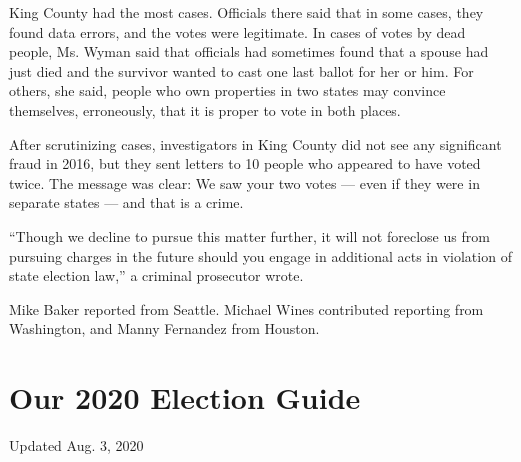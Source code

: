 King County had the most cases. Officials there said that in some cases,
they found data errors, and the votes were legitimate. In cases of votes
by dead people, Ms. Wyman said that officials had sometimes found that a
spouse had just died and the survivor wanted to cast one last ballot for
her or him. For others, she said, people who own properties in two
states may convince themselves, erroneously, that it is proper to vote
in both places.

After scrutinizing cases, investigators in King County did not see any
significant fraud in 2016, but they sent letters to 10 people who
appeared to have voted twice. The message was clear: We saw your two
votes --- even if they were in separate states --- and that is a crime.

``Though we decline to pursue this matter further, it will not foreclose
us from pursuing charges in the future should you engage in additional
acts in violation of state election law,'' a criminal prosecutor wrote.

Mike Baker reported from Seattle. Michael Wines contributed reporting
from Washington, and Manny Fernandez from Houston.

\hypertarget{our-2020-election-guide}{%
\section{Our 2020 Election Guide}\label{our-2020-election-guide}}

Updated Aug. 3, 2020

